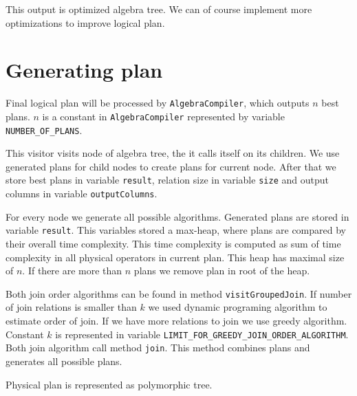 This output is optimized algebra tree. We can of course implement more optimizations to improve logical plan.

\section{Generating plan}

Final logical plan will be processed by \texttt{AlgebraCompiler}, which outputs $n$ best plans. $n$ is a constant in  \texttt{AlgebraCompiler} represented by variable \texttt{NUM\-BER\_\-OF\_\-PLANS}. 

This visitor visits node of algebra tree, the it calls itself on its children. We use generated plans for child nodes to create plans for current node. After that we store best plans in variable \texttt{result}, relation size in variable \texttt{size} and output columns in variable \texttt{outputColumns}. 

For every node we generate all possible algorithms. Generated plans are stored in variable \texttt{result}. This variables stored a max-heap, where plans are compared by their overall time complexity. This time complexity is computed as sum of time complexity in all physical operators in current plan. This heap has maximal size of $n$. If there are more than $n$ plans we remove plan in root of the heap.

Both join order algorithms can be found in method \texttt{visitGroupedJoin}. If number of join relations is smaller than $k$ we used dynamic programing algorithm to estimate order of join. If we have more relations to join we use greedy algorithm. Constant $k$ is represented in variable \texttt{LI\-MIT\_\-FOR\_\-GREEDY\_\-JOIN\_\-ORDER\_\-ALGORITHM}. Both join algorithm call method \texttt{join}. This method combines plans and generates all possible plans.


Physical plan is represented as polymorphic tree. 


